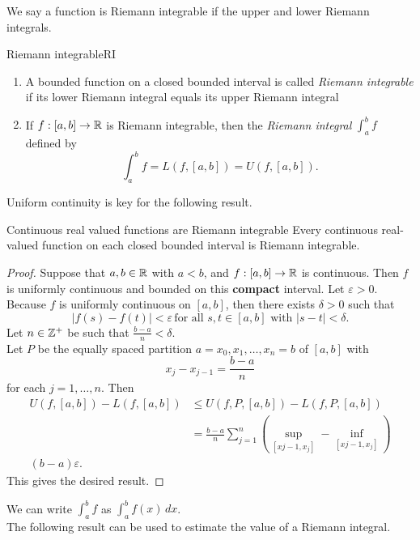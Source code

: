 \documentclass[twoside, openright, fontsize=10pt, headings=big]{scrbook}
\begin{document}
We say a function is Riemann integrable if the upper and lower Riemann integrals.
\begin{definition}{Riemann integrable}{RI}
    \begin{enumerate}
        \item A bounded function on a closed bounded interval is called \textit{Riemann integrable} if its lower Riemann integral equals its upper Riemann integral
        \item If $f : [a, b] \to \mathbb{R}$ is Riemann integrable, then the \textit{Riemann integral} $\displaystyle\int_{a}^{b}f$ defined by
        \[
            \int_{a}^{b}f=L(f,[a,b])=U(f,[a,b]).
        \]
    \end{enumerate}
\end{definition}
Uniform continuity is key for the following result.
\begin{theorem}{Continuous real valued functions are Riemann integrable}{}
    Every continuous real-valued function on each closed bounded interval is Riemann integrable.
\end{theorem}
\begin{proof}
    Suppose that $a,b\in\mathbb{R}$ with $a<b$, and $f:[a,b]\to\mathbb{R}$ is continuous. Then $f$ is uniformly continuous and bounded on this \textbf{compact} interval. Let $\varepsilon>0$. Because $f$ is uniformly continuous on $[a,b]$, then there exists $\delta>0$ such that 
    \begin{equation}\label{eq:CRI}
        |f(s)-f(t)|<\varepsilon\,\text{for all } s,t\in[a,b] \text{ with } |s-t|<\delta.
    \end{equation}
    Let $n\in\mathbb{Z}^+$ be such that $\frac{b-a}{n}<\delta$.\\
    Let $P$ be the equally spaced partition $a = x_0, x_1,\dots, x_n = b$ of $[a, b]$ with
    \[
        x_j-x_{j-1}=\frac{b-a}{n}
    \]
    for each $j=1,\dots,n.$ Then
    \begin{align*}
        U(f,[a,b])-L(f,[a,b])&\leq U(f,P,[a,b])-L(f,P,[a,b])\\
        &=\frac{b-a}{n}\sum_{j=1}^{n}\left(\underset{[x{j-1},x_j]}{\sup}-\underset{[x{j-1},x_j]}{\inf}\right)\\
        (b-a)\varepsilon.
    \end{align*}
    This gives the desired result.
\end{proof}
We can write $\int_{a}^{b}f$ as $\int_{a}^{b}f(x)\,dx$.\\
The following result can be used to estimate the value of a Riemann integral.
\end{document}
